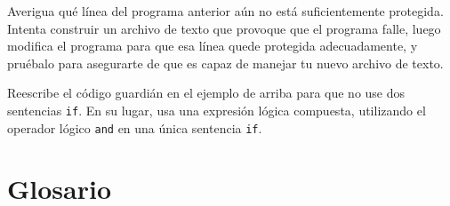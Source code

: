 \begin{enumerate}
\begin{ex}

Averigua qué línea del programa anterior aún no está suficientemente protegida.
Intenta construir un archivo de texto que provoque que el programa falle,
luego modifica el programa para que esa línea quede protegida adecuadamente, y
pruébalo para asegurarte de que es capaz de manejar tu nuevo archivo de texto.

\end{ex}

\begin{ex}
Reescribe el código guardián en el ejemplo de arriba para que no use dos
sentencias {\tt if}. En su lugar, usa una expresión lógica compuesta, utilizando
el operador lógico {\tt and} en una única sentencia {\tt if}.
\end{ex}


\end{enumerate}



\section{Glosario}

